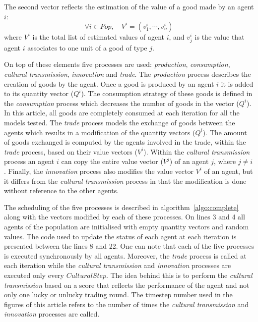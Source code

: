 \documentclass{wscpaperproc}
\begin{document}
The second vector reflects the estimation of the value of a good made by an agent $i$:
$$\forall i \in Pop, \quad V^i = (v^i_1,\cdots,v^i_n) $$
where $V^i$ is the total list of estimated values of agent $i$, and $v^i_j$ is the value that agent $i$ associates to one unit of a good of type $j$.

On top of these elements five processes are used: \emph{production}, \emph{consumption}, \emph{cultural transmission}, \emph{innovation} and \emph{trade}. The \emph{production} process describes the creation of goods by the agent. Once a good is produced by an agent $i$ it is added to its quantity vector ($Q^i$). The consumption strategy of these goods is defined in the \emph{consumption} process which decreases the number of goods in the vector ($Q^i$). In this article, all goods are completely consumed at each iteration for all the models tested. The \emph{trade} process models the exchange of goods between the agents which results in a modification of the quantity vectors ($Q^i$). The amount of goods exchanged is computed by the agents involved in the trade, within the \emph{trade} process, based on their value vectors ($V^i$). Within the \emph{cultural transmission} process an agent $i$ can copy the entire value vector ($V^j$) of an agent $j$, where $j \neq i$. Finally, the \textit{innovation} process also modifies the value vector $V^i$ of an agent, but it differs from the \emph{cultural transmission} process in that the modification is done without reference to the other agents.

The scheduling of the five processes is described in algorithm~\ref{algo:complete} along with the vectors modified by each of these processes. On lines 3 and 4 all agents of the population are initialised with empty quantity vectors and random values. The code used to update the status of each agent at each iteration is presented between the lines 8 and 22. One can note that each of the five processes is executed synchronously by all agents. Moreover, the \emph{trade} process is called at each iteration while the \emph{cultural transmission} and \emph{innovation} processes are executed only every $CulturalStep$. The idea behind this is to perform the \emph{cultural transmission} based on a score that reflects the performance of the agent and not only one lucky or unlucky trading round. The timestep number used in the figures of this article refers to the number of times the \emph{cultural transmission} and \emph{innovation} processes are called.
\end{document}
